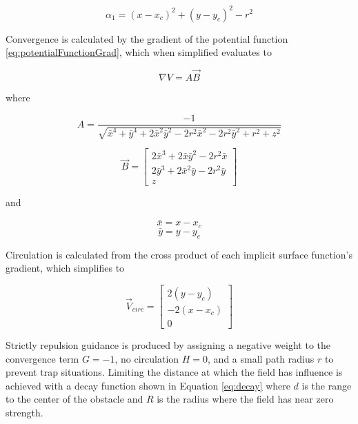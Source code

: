 \documentclass[conf]{new-aiaa}
\begin{document}
\begin{equation}\label{eq:alphaCylinder}
\alpha_1 = (x-x_c)^2 + (y-y_c)^2-r^2
\end{equation}


Convergence is calculated by the gradient of the potential function \ref{eq:potentialFunctionGrad}, which when simplified evaluates to

\begin{equation}
\nabla V = A\overrightarrow{B}
\end{equation}

where


\begin{equation}
A = \dfrac{-1}{\sqrt{\bar{x}^4+\bar{y}^4+2\bar{x}^2\bar{y}^2-2r^2\bar{x}^2-2r^2\bar{y}^2+r^2+z^2}}
\end{equation}

\begin{equation}
\overrightarrow{B} = \begin{bmatrix} 2\bar{x}^3+2\bar{x}\bar{y}^2-2r^2\bar{x} \\ 2\bar{y}^3+2\bar{x}^2\bar{y}-2r^2\bar{y} \\z \end{bmatrix}
\end{equation}

and


\begin{equation}
\bar{x} = x - x_c
\end{equation}
\begin{equation}
\bar{y} = y - y_c
\end{equation}

Circulation is calculated from the cross product of each implicit surface function's gradient, which simplifies to

\begin{equation}\label{eq:vcirc_circle}
\overrightarrow{V}_{circ} =  \begin{bmatrix}  2(y-y_c) \\[6pt] -2(x-x_c) \\[6pt] 0\end{bmatrix}
\end{equation}



Strictly repulsion guidance is produced by assigning a negative weight to the convergence term $G=-1$, no circulation $H=0$, and a small path radius $r$ to prevent trap situations. Limiting the distance at which the field has influence is achieved with a decay function shown in Equation \ref{eq:decay} where $d$ is the range to the center of the obstacle and $R$ is the radius where the field has near zero strength. 
\end{document}
